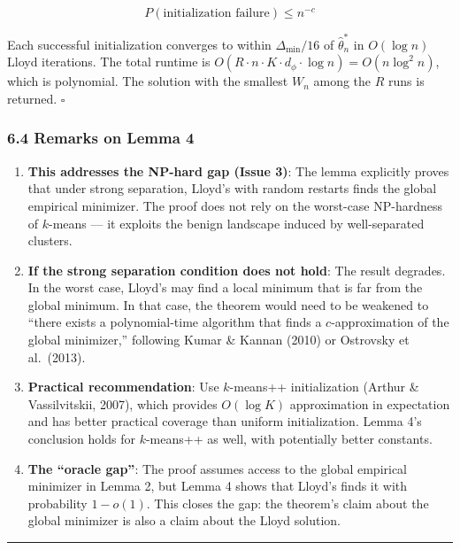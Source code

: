 \documentclass[
  12pt,
]{article}
\begin{document}
\[P(\text{initialization failure}) \leq n^{-c}\]

Each successful initialization converges to within \(\Delta_{\min}/16\)
of \(\hat{\theta}_n^*\) in \(O(\log n)\) Lloyd iterations. The total
runtime is
\(O(R \cdot n \cdot K \cdot d_\phi \cdot \log n) = O(n \log^2 n)\),
which is polynomial. The solution with the smallest \(W_n\) among the
\(R\) runs is returned. \(\square\)

\subsubsection{6.4 Remarks on Lemma 4}\label{remarks-on-lemma-4}

\begin{enumerate}
\def\labelenumi{\arabic{enumi}.}
\item
  \textbf{This addresses the NP-hard gap (Issue 3)}: The lemma
  explicitly proves that under strong separation, Lloyd's with random
  restarts finds the global empirical minimizer. The proof does not rely
  on the worst-case NP-hardness of \(k\)-means --- it exploits the
  benign landscape induced by well-separated clusters.
\item
  \textbf{If the strong separation condition does not hold}: The result
  degrades. In the worst case, Lloyd's may find a local minimum that is
  far from the global minimum. In that case, the theorem would need to
  be weakened to ``there exists a polynomial-time algorithm that finds a
  \(c\)-approximation of the global minimizer,'' following Kumar \&
  Kannan (2010) or Ostrovsky et al.~(2013).
\item
  \textbf{Practical recommendation}: Use \(k\)-means++ initialization
  (Arthur \& Vassilvitskii, 2007), which provides \(O(\log K)\)
  approximation in expectation and has better practical coverage than
  uniform initialization. Lemma 4's conclusion holds for \(k\)-means++
  as well, with potentially better constants.
\item
  \textbf{The ``oracle gap''}: The proof assumes access to the global
  empirical minimizer in Lemma 2, but Lemma 4 shows that Lloyd's finds
  it with probability \(1 - o(1)\). This closes the gap: the theorem's
  claim about the global minimizer is also a claim about the Lloyd
  solution.
\end{enumerate}

\begin{center}\rule{0.5\linewidth}{0.5pt}\end{center}
\end{document}
